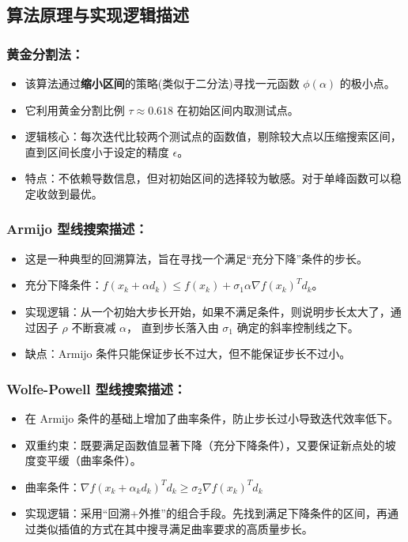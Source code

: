 \documentclass[12pt,a4paper]{ctexart}
\begin{document}
\subsection{算法原理与实现逻辑描述}
\subsubsection{黄金分割法：}
\begin{itemize}
	\item 该算法通过\textbf{缩小区间}的策略(类似于二分法)寻找一元函数 $\phi(\alpha)$ 的极小点。
	\item 它利用黄金分割比例 $\tau \approx 0.618$ 在初始区间内取测试点。
	\item 逻辑核心：每次迭代比较两个测试点的函数值，剔除较大点以压缩搜索区间，直到区间长度小于设定的精度 $\epsilon$。
	\item 特点：不依赖导数信息，但对初始区间的选择较为敏感。对于单峰函数可以稳定收敛到最优。
\end{itemize}

\subsubsection{Armijo 型线搜索描述：}
\begin{itemize}
	\item 这是一种典型的回溯算法，旨在寻找一个满足“充分下降”条件的步长。
	\item 充分下降条件：$f(x_k + \alpha d_k) \leq f(x_k) + \sigma_1 \alpha \nabla f(x_k)^T d_k$。
	\item 实现逻辑：从一个初始大步长开始，如果不满足条件，则说明步长太大了，通过因子 $\rho$ 不断衰减 $\alpha$，
			直到步长落入由 $\sigma_1$ 确定的斜率控制线之下。
	\item 缺点：Armijo 条件只能保证步长不过大，但不能保证步长不过小。
\end{itemize}

\subsubsection{Wolfe-Powell 型线搜索描述：}
\begin{itemize}
	\item 在 Armijo 条件的基础上增加了曲率条件，防止步长过小导致迭代效率低下。
	\item 双重约束：既要满足函数值显著下降（充分下降条件），又要保证新点处的坡度变平缓（曲率条件）。
	\item 曲率条件：$ \nabla f(x_k + \alpha_k d_k)^T d_k \geq \sigma_2 \nabla f(x_k)^T d_k $
	\item 实现逻辑：采用“回溯+外推”的组合手段。先找到满足下降条件的区间，再通过类似插值的方式在其中搜寻满足曲率要求的高质量步长。
\end{itemize}
\end{document}
